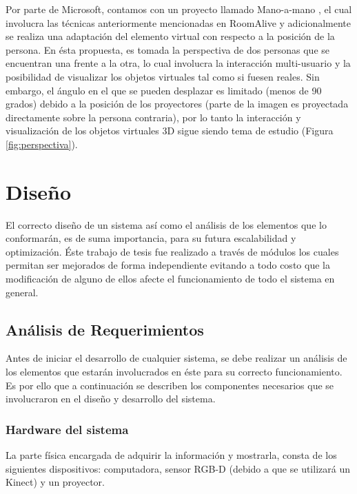 \documentclass[a4paper,openright,12pt]{report}
\begin{document}
Por parte de Microsoft\textregistered, contamos con un proyecto llamado Mano-a-mano \citep{benko2014}, el cual involucra las técnicas anteriormente mencionadas en RoomAlive y adicionalmente se realiza una adaptación del elemento virtual con respecto a la posición de la persona. En ésta propuesta, es tomada la perspectiva de dos personas que se encuentran una frente a la otra, lo cual involucra la interacción multi-usuario y la posibilidad de visualizar los objetos virtuales tal como si fuesen reales. Sin embargo, el ángulo en el que se pueden desplazar es limitado (menos de 90 grados) debido a la posición de los proyectores (parte de la imagen es proyectada directamente sobre la persona contraria), por lo tanto la interacción y visualización de los objetos virtuales 3D sigue siendo tema de estudio (Figura \ref{fig:perspectiva}).%

\chapter{Dise\~no}\label{cap.diseno}
El correcto diseño de un sistema así como el análisis de los elementos que lo conformarán, es de suma importancia, para su futura escalabilidad y optimización. Éste trabajo de tesis fue realizado a través de módulos los cuales permitan ser mejorados de forma independiente evitando a todo costo que la modificación de alguno de ellos afecte el funcionamiento de todo el sistema en general.\\
\section{Análisis de Requerimientos}
Antes de iniciar el desarrollo de cualquier sistema, se debe realizar un análisis de los elementos que estarán involucrados en éste para su correcto funcionamiento. Es por ello que a continuación se describen los componentes necesarios que se involucraron en el diseño y desarrollo del sistema.

\subsection{Hardware del sistema}
La parte física encargada de adquirir la información y mostrarla, consta de los siguientes dispositivos: computadora, sensor RGB-D (debido a que se utilizará un Kinect\textregistered) y un proyector.\\
\end{document}
